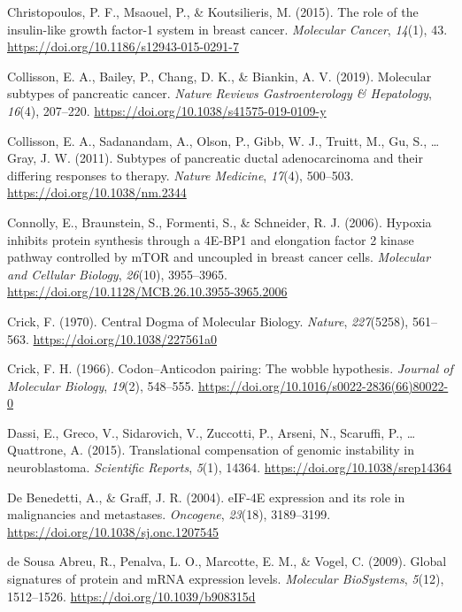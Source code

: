\documentclass[12pt,openany]{book}
\begin{document}
\hypertarget{ref-Christopoulos2015}{}
Christopoulos, P. F., Msaouel, P., \& Koutsilieris, M. (2015). The role
of the insulin-like growth factor-1 system in breast cancer.
\emph{Molecular Cancer}, \emph{14}(1), 43.
\url{https://doi.org/10.1186/s12943-015-0291-7}

\hypertarget{ref-Collisson2019}{}
Collisson, E. A., Bailey, P., Chang, D. K., \& Biankin, A. V. (2019).
Molecular subtypes of pancreatic cancer. \emph{Nature Reviews
Gastroenterology \& Hepatology}, \emph{16}(4), 207--220.
\url{https://doi.org/10.1038/s41575-019-0109-y}

\hypertarget{ref-Collisson2011}{}
Collisson, E. A., Sadanandam, A., Olson, P., Gibb, W. J., Truitt, M.,
Gu, S., \ldots{} Gray, J. W. (2011). Subtypes of pancreatic ductal
adenocarcinoma and their differing responses to therapy. \emph{Nature
Medicine}, \emph{17}(4), 500--503. \url{https://doi.org/10.1038/nm.2344}

\hypertarget{ref-Connolly2006}{}
Connolly, E., Braunstein, S., Formenti, S., \& Schneider, R. J. (2006).
Hypoxia inhibits protein synthesis through a 4E-BP1 and elongation
factor 2 kinase pathway controlled by mTOR and uncoupled in breast
cancer cells. \emph{Molecular and Cellular Biology}, \emph{26}(10),
3955--3965. \url{https://doi.org/10.1128/MCB.26.10.3955-3965.2006}

\hypertarget{ref-Crick1970}{}
Crick, F. (1970). Central Dogma of Molecular Biology. \emph{Nature},
\emph{227}(5258), 561--563. \url{https://doi.org/10.1038/227561a0}

\hypertarget{ref-Crick1966}{}
Crick, F. H. (1966). Codon--Anticodon pairing: The wobble hypothesis.
\emph{Journal of Molecular Biology}, \emph{19}(2), 548--555.
\url{https://doi.org/10.1016/s0022-2836(66)80022-0}

\hypertarget{ref-Dassi2015}{}
Dassi, E., Greco, V., Sidarovich, V., Zuccotti, P., Arseni, N.,
Scaruffi, P., \ldots{} Quattrone, A. (2015). Translational compensation
of genomic instability in neuroblastoma. \emph{Scientific Reports},
\emph{5}(1), 14364. \url{https://doi.org/10.1038/srep14364}

\hypertarget{ref-DeBenedetti2004}{}
De Benedetti, A., \& Graff, J. R. (2004). eIF-4E expression and its role
in malignancies and metastases. \emph{Oncogene}, \emph{23}(18),
3189--3199. \url{https://doi.org/10.1038/sj.onc.1207545}

\hypertarget{ref-deSousaAbreu2009}{}
de Sousa Abreu, R., Penalva, L. O., Marcotte, E. M., \& Vogel, C.
(2009). Global signatures of protein and mRNA expression levels.
\emph{Molecular BioSystems}, \emph{5}(12), 1512--1526.
\url{https://doi.org/10.1039/b908315d}
\end{document}
